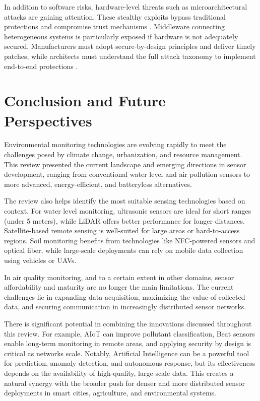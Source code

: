 \documentclass[conference]{IEEEtran}
\begin{document}
In addition to software risks, hardware-level threats such as microarchitectural attacks are gaining attention. These stealthy exploits bypass traditional protections and compromise trust mechanisms \cite{fournaris_2017_exploiting}. Middleware connecting heterogeneous systems is particularly exposed if hardware is not adequately secured. Manufacturers must adopt secure-by-design principles and deliver timely patches, while architects must understand the full attack taxonomy to implement end-to-end protections \cite{fournaris_2017_exploiting, pimentel_2017_exploring}.

\section{Conclusion and Future Perspectives} \label{cap:conclusion}

Environmental monitoring technologies are evolving rapidly to meet the challenges posed by climate change, urbanization, and resource management. This review presented the current landscape and emerging directions in sensor development, ranging from conventional water level and air pollution sensors to more advanced, energy-efficient, and batteryless alternatives.

The review also helps identify the most suitable sensing technologies based on context. For water level monitoring, ultrasonic sensors are ideal for short ranges (under 5 meters), while LiDAR offers better performance for longer distances. Satellite-based remote sensing is well-suited for large areas or hard-to-access regions. Soil monitoring benefits from technologies like NFC-powered sensors and optical fiber, while large-scale deployments can rely on mobile data collection using vehicles or UAVs.

In air quality monitoring, and to a certain extent in other domains, sensor affordability and maturity are no longer the main limitations. The current challenges lie in expanding data acquisition, maximizing the value of collected data, and securing communication in increasingly distributed sensor networks.

There is significant potential in combining the innovations discussed throughout this review. For example, AIoT can improve pollutant classification, Beat sensors enable long-term monitoring in remote areas, and applying security by design is critical as networks scale. Notably, Artificial Intelligence can be a powerful tool for prediction, anomaly detection, and autonomous response, but its effectiveness depends on the availability of high-quality, large-scale data. This creates a natural synergy with the broader push for denser and more distributed sensor deployments in smart cities, agriculture, and environmental systems.
\end{document}
